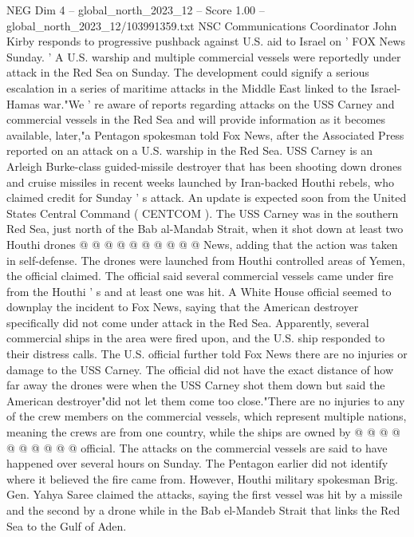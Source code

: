 \begin{textsample}{NEG Dim 4 – global\_north\_2023\_12 – Score 1.00 – global\_north\_2023\_12/103991359.txt}  \label{ex:f4_neg_158}
NSC Communications Coordinator John Kirby responds to progressive pushback against U.S. aid to Israel on ' FOX News Sunday. ' A U.S. warship and multiple commercial vessels were reportedly under attack in the Red Sea on Sunday.
The development could signify a serious escalation in a series of maritime attacks in the Middle East linked to the Israel-Hamas war."We ' re aware of reports regarding attacks on the USS Carney and commercial vessels in the Red Sea and will provide information as it becomes available, later,"a Pentagon spokesman told Fox News, after the Associated Press reported on an attack on a U.S. warship in the Red Sea.
USS Carney is an Arleigh Burke-class guided-missile destroyer that has been shooting down drones and cruise missiles in recent weeks launched by Iran-backed Houthi rebels, who claimed credit for Sunday ' s attack.
An update is expected soon from the United States Central Command ( CENTCOM ).
The USS Carney was in the southern Red Sea, just north of the Bab al-Mandab Strait, when it shot down at least two Houthi drones @ @ @ @ @ @ @ @ @ @ News, adding that the action was taken in self-defense.
The drones were launched from Houthi controlled areas of Yemen, the official claimed.
The official said several commercial vessels came under fire from the Houthi ' s and at least one was hit.
A White House official seemed to downplay the incident to Fox News, saying that the American destroyer specifically did not come under attack in the Red Sea.
Apparently, several commercial ships in the area were fired upon, and the U.S. ship responded to their distress calls.
The U.S. official further told Fox News there are no injuries or damage to the USS Carney.
The official did not have the exact distance of how far away the drones were when the USS Carney shot them down but said the American destroyer"did not let them come too close."There are no injuries to any of the crew members on the commercial vessels, which represent multiple nations, meaning the crews are from one country, while the ships are owned by @ @ @ @ @ @ @ @ @ @ official.
The attacks on the commercial vessels are said to have happened over several hours on Sunday.
The Pentagon earlier did not identify where it believed the fire came from.
However, Houthi military spokesman Brig.
Gen.
Yahya Saree claimed the attacks, saying the first vessel was hit by a missile and the second by a drone while in the Bab el-Mandeb Strait that links the Red Sea to the Gulf of Aden.

\end{textsample}
